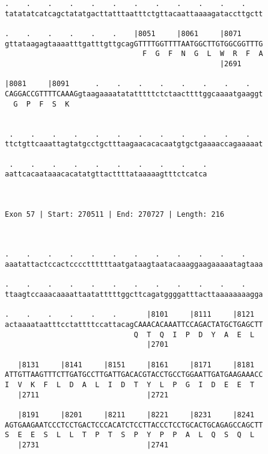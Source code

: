 \documentclass{article}
\begin{document}
\begin{Verbatim}
.    .    .    .    .    .    .    .    .    .    .    .    
tatatatcatcagctatatgacttatttaatttctgttacaattaaaagataccttgctt
                                                            
.    .    .    .    .    .    |8051     |8061     |8071     
gttataagagtaaaatttgatttgttgcagGTTTTGGTTTTAATGGCTTGTGGCGGTTTG
                                F  G  F  N  G  L  W  R  F  A
                                                  |2691     
  
|8081     |8091      .    .    .    .    .    .    .    .   
CAGGACCGTTTTCAAAGgtaagaaaatatatttttctctaacttttggcaaaatgaaggt
  G  P  F  S  K                                             
                                                            
  
 .    .    .    .    .    .    .    .    .    .    .    .   
ttctgttcaaattagtatgcctgctttaagaacacacaatgtgctgaaaaccagaaaaat
                                                            
 .    .    .    .    .    .    .    .    .    .
aattcacaataaacacatatgttacttttataaaaagtttctcatca
                                               
                                               
 
Exon 57 | Start: 270511 | End: 270727 | Length: 216



.    .    .    .    .    .    .    .    .    .    .    .    
aaatattactccactccccttttttaatgataagtaatacaaaggaagaaaaatagtaaa
                                                            
.    .    .    .    .    .    .    .    .    .    .    .    
ttaagtccaaacaaaattaatatttttggcttcagatggggatttacttaaaaaaaagga
                                                            
.    .    .    .    .    .       |8101     |8111     |8121  
actaaaataatttcctattttccattacagCAAACACAAATTCCAGACTATGCTGAGCTT
                              Q  T  Q  I  P  D  Y  A  E  L  
                                 |2701                      
  
   |8131     |8141     |8151     |8161     |8171     |8181  
ATTGTTAAGTTTCTTGATGCCTTGATTGACACGTACCTGCCTGGAATTGATGAAGAAACC
I  V  K  F  L  D  A  L  I  D  T  Y  L  P  G  I  D  E  E  T  
   |2711                         |2721                      
  
   |8191     |8201     |8211     |8221     |8231     |8241  
AGTGAAGAATCCCTCCTGACTCCCACATCTCCTTACCCTCCTGCACTGCAGAGCCAGCTT
S  E  E  S  L  L  T  P  T  S  P  Y  P  P  A  L  Q  S  Q  L  
   |2731                         |2741                      
  

\end{Verbatim}
\end{document}
